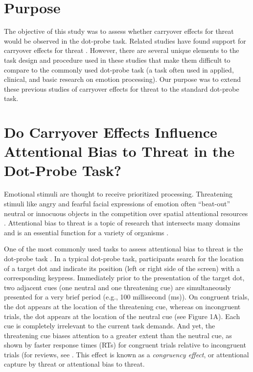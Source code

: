 \documentclass{article}
\begin{document}
\section{Purpose }

The objective of this study was to assess whether carryover effects for threat would be observed in the dot-probe task. Related studies have found support for carryover effects for threat \parencite{Gladwin2017, Gladwin2017, Gladwin2019, Gladwin2020, Gladwin2019a}. However, there are several unique elements to the task design and procedure used in these studies that make them difficult to compare to the commonly used dot-probe task (a task often used in applied, clinical, and basic research on emotion processing). Our purpose was to extend these previous studies of carryover effects for threat to the standard dot-probe task.











\section{Do Carryover Effects Influence Attentional Bias to Threat in the Dot-Probe Task?}

Emotional stimuli are thought to receive prioritized processing. Threatening stimuli like angry and fearful facial expressions of emotion often “beat-out” neutral or innocuous objects \parencite{Becker2017, Schubö2006} in the competition over spatial attentional resources \parencite{Desimone1995}. Attentional bias to threat is a topic of research that intersects many domains and is an essential function for a variety of organisms \parencite{Anderson2019}.

One of the most commonly used tasks to assess attentional bias to threat is the dot-probe task \parencite{MacLeod1986}. In a typical dot-probe task, participants search for the location of a target dot and indicate its position (left or right side of the screen) with a corresponding keypress. Immediately prior to the presentation of the target dot, two adjacent cues (one neutral and one threatening cue) are simultaneously presented for a very brief period (e.g., 100 millisecond (ms)). On congruent trials, the dot appears at the location of the threatening cue, whereas on incongruent trials, the dot appears at the location of the neutral cue (see Figure 1A). Each cue is completely irrelevant to the current task demands. And yet, the threatening cue biases attention to a greater extent than the neutral cue, as shown by faster response times (RTs) for congruent trials relative to incongruent trials (for reviews, see \parencite{Carretié2014, Imhoff2019}. This effect is known as a \emph{congruency effect}, or attentional capture by threat or attentional bias to threat.
\end{document}
